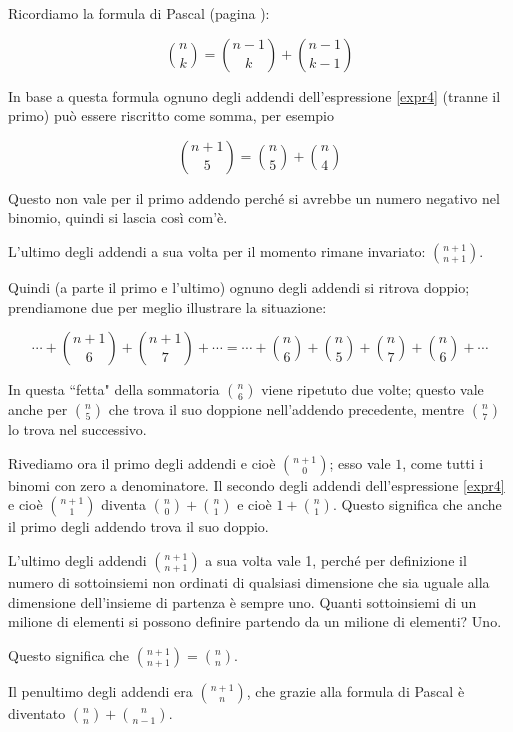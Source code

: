 Ricordiamo la formula di Pascal (pagina \pageref{formula_pascal}):


\begin{equation*}
{n \choose k}={n-1 \choose k}+{n-1 \choose k-1}
\end{equation*}

In base a questa formula ognuno degli addendi dell'espressione \ref{expr4} (tranne il primo) può essere riscritto come somma, per esempio


\begin{equation*}
{n+1 \choose 5}={n \choose 5}+{n \choose 4}
\end{equation*}

Questo non vale per il primo addendo perché si avrebbe un numero negativo nel binomio, quindi si lascia così com'è.

L'ultimo degli addendi a sua volta per il momento rimane invariato: ${n+1\choose n+1}$.

Quindi (a parte il primo e l'ultimo) ognuno degli addendi si ritrova doppio; prendiamone due per meglio illustrare la situazione:

\begin{equation*}
\cdots+{n+1\choose 6}+{n+1\choose 7}+\cdots
=
\cdots+{n\choose 6}+{n \choose 5}+{n\choose 7}+{n\choose 6}+\cdots
\end{equation*}

In questa ``fetta" della sommatoria ${n\choose 6}$ viene ripetuto due volte; questo vale anche per ${n\choose 5}$ che trova il suo doppione nell'addendo precedente, mentre ${n \choose 7}$ lo trova nel successivo.

Rivediamo ora il primo degli addendi e cioè ${n+1 \choose 0}$; esso vale $1$, come tutti i binomi con zero a denominatore.
Il secondo degli addendi dell'espressione \ref{expr4} e cioè ${n+1\choose 1}$ diventa ${n\choose 0}+{n\choose 1}$ e cioè $1+{n\choose 1}$.  Questo significa che anche il primo degli addendo trova il suo doppio.

L'ultimo degli addendi ${n+1\choose n+1}$ a sua volta vale 1, perché per definizione il numero di sottoinsiemi non ordinati di qualsiasi dimensione che sia uguale alla dimensione dell'insieme di partenza è sempre uno.  Quanti sottoinsiemi di un milione di elementi si possono definire partendo da un milione di elementi?  Uno.

Questo significa che ${n+1\choose n+1}={n\choose n}$.

Il penultimo degli addendi era ${n+1\choose n}$, che grazie alla formula di Pascal è diventato ${n\choose n}+{n\choose n-1}$.


